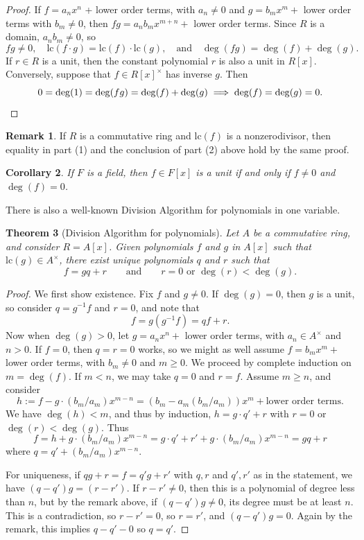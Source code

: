 \documentclass[12pt]{report}
\newtheorem{theorem}{Theorem}[chapter]
\newtheorem{corollary}[theorem]{Corollary}
\numberwithin{equation}{section}
\numberwithin{theorem}{chapter}
\theoremstyle{definition}
\newtheorem*{basic properties}{Basic Properties}
\newtheorem*{Important Remark}{Important Remark}
\newtheorem{remark}[theorem]{Remark}
\begin{document}
\begin{proof}
If $f = a_n x^n$ + lower order terms, with $a_n \neq 0$ and $g =b_m x^m + $ lower order terms with $b_m \neq 0$, then $fg = a_n b_m x^{m+n} + $ lower order terms. 
Since $R$ is a domain, $a_n b_m \neq 0$, so
$$fg \neq 0, \quad \mathrm{lc}(f \cdot g) = \mathrm{lc}(f) \cdot \mathrm{lc}(g), \quad \text{and} \quad \deg(f g)=\deg(f)+\deg(g).$$
If $r \in R$ is a unit, then the constant polynomial $r$ is also a unit in $R[x]$. Conversely, suppose that $f \in R[x]^\times$ has inverse $g$. Then 
$$0 = \deg(1) = \deg(fg) = \deg(f) + \deg(g) \implies \deg(f) = \deg(g) = 0.\qedhere$$
\end{proof}

\begin{remark}
If $R$ is a commutative ring and $\mathrm{lc}(f)$ is a nonzerodivisor, then equality in part (1) and the conclusion of part (2) above hold by the same proof.
\end{remark}


\begin{corollary}\label{units in F[x]}
	If $F$ is a field, then $f \in F[x]$ is a unit if and only if $f \neq 0$ and $\deg(f) = 0$.
\end{corollary}


There is also a well-known Division Algorithm for polynomials in one variable.


\begin{theorem}[Division Algorithm for polynomials]\label{division algorithm polynomials}
Let $A$ be a commutative ring, and consider $R = A[x]$. Given polynomials $f$ and $g$ in $A[x]$ such that $\mathrm{lc}(g) \in A^\times$, there exist unique polynomials $q$ and $r$ such that 
$$f = gq + r \qquad \text{and} \qquad r=0 \text{ or } \deg(r) < \deg(g).$$
\end{theorem}


\begin{proof} We first show existence.
Fix $f$ and $g \neq 0$.
If $\deg(g) = 0$, then $g$ is a unit, so consider $q = g^{-1}f$ and $r = 0$, and note that
$$f = g(g^{-1}f) = qf+r.$$
Now when $\deg(g)>0$, let $g = a_nx^n + $ lower order terms, with $a_n \in A^\times$ and $n > 0$. If $f = 0$, then $q=r=0$ works, so we might as well assume $f = b_m x^m + $ lower order terms, with $b_m \neq 0$ and $m \geqslant 0$.
We proceed by complete induction on $m = \deg(f)$. If $m < n$, we may take $q = 0$ and $r = f$. Assume $m \geqslant n$, and consider
$$h := f - g \cdot (b_m/a_m) x^{m- n} = (b_m - a_m(b_m/a_m)) x^m + \text{lower order terms}.$$
We have $\deg(h) < m$, and thus  by induction, $h = g \cdot q' + r$ with $r = 0$ or $\deg(r) < \deg(g)$. Thus
$$f = h + g \cdot (b_m/a_m) x^{m-n} =  g \cdot q' + r' + g \cdot (b_m/a_m) x^{m-n} = g q + r$$
where $q = q' + (b_m/a_m) x^{m-n}$.

For uniqueness, if $qg+r = f = q' g + r'$ with $q,r$ and $q',r'$ as in the statement, we have $(q-q') g = (r-r')$. If $r-r'\neq 0$, then this is a polynomial of degree less than $n$, but by the remark above, if $(q-q') g\neq 0$, its degree must be at least $n$. This is a contradiction, so $r-r'=0$, so $r=r'$, and $(q-q')g=0$. Again by the remark, this implies $q-q'-0$ so $q=q'$.
\end{proof}
\end{document}
